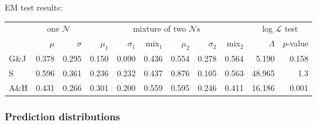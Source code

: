 \begin{example}
EM test results:

\vspace{0.5\baselineskip}
\begin{tabular}{l | r r | r r r r r r | r r}
\toprule
     & \multicolumn{2}{c|}{one $\mathcal{N}$} & \multicolumn{6}{c|}{mixture of two $\mathcal{N}$s} & \multicolumn{2}{c}{log $\mathcal{L}$ test} \\
     & $\mu$ & $\sigma$ & $\mu_1$ & $\sigma_1$ & mix$_1$ & $\mu_2$ & $\sigma_2$ & mix$_2$ & $\Lambda$ & $p$-value  \\
\midrule
G\&J & 0.378 & 0.295    & 0.150   & 0.090      & 0.436     & 0.554   & 0.278    & 0.564     & 5.190    & 0.158   \\
S    & 0.596 & 0.361    & 0.236   & 0.232      & 0.437     & 0.876   & 0.105    & 0.563 & 48.965    & 1.3\e{-10} \\
A\&H & 0.431 & 0.266    & 0.301   & 0.200      & 0.559     & 0.595   & 0.246    & 0.411 & 16.186    & 0.001      \\
\bottomrule
\end{tabular}
\end{example}


\subsubsection{Prediction distributions}

